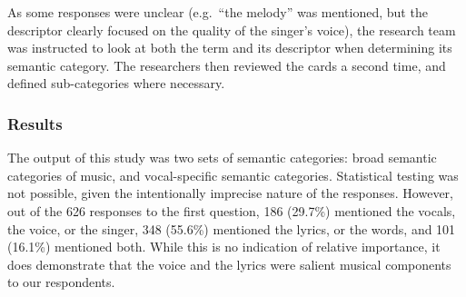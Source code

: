 \documentclass{article}
\newcommand {\rmb}[1]{{\color{red}{[{#1}]}}}
\begin{document}


As some responses were unclear (e.g.~``the melody'' was mentioned, but the descriptor clearly focused on the quality of the singer's voice), the research team was instructed to look at both the term and its descriptor when determining its semantic category.
The researchers then reviewed the cards a second time, and defined sub-categories where necessary.

\subsubsection{Results}

The output of this study was two sets of semantic categories: broad semantic categories of music, and vocal-specific semantic categories.
Statistical testing was not possible, given the intentionally imprecise nature of the responses.
However, out of the 626 responses to the first question, 186 (29.7\%) mentioned the vocals, the voice, or the singer, 348 (55.6\%) mentioned the lyrics, or the words, and 101 (16.1\%) mentioned both. While this is no indication of relative importance, it does demonstrate that the voice and the lyrics were salient musical components to our respondents.
\end{document}
